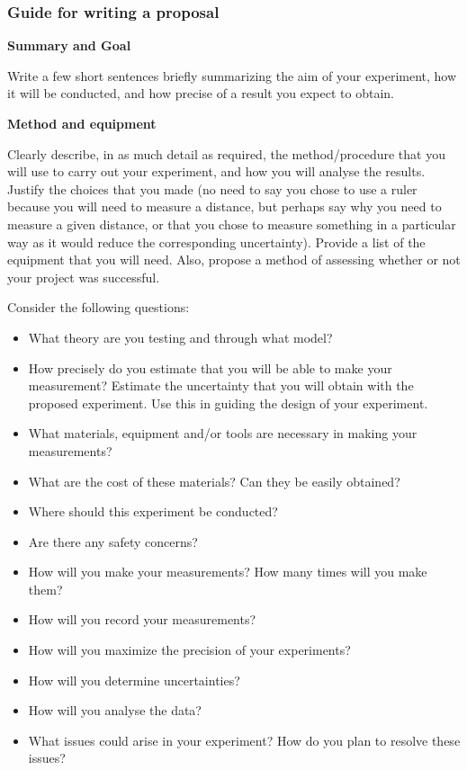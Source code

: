 \subsubsection{Guide for writing a proposal}

\textbf{Summary and Goal}

Write a few short sentences briefly summarizing the aim of your experiment, how it will be conducted, and how precise of a result you expect to obtain.

\textbf{Method and equipment}

Clearly describe, in as much detail as required, the method/procedure that you will use to carry out your experiment, and how you will analyse the results. Justify the choices that you made (no need to say you chose to use a ruler because you will need to measure a distance, but perhaps say why you need to measure a given distance, or that you chose to measure something in a particular way as it would reduce the corresponding uncertainty). Provide a list of the equipment that you will need. Also, propose a method of assessing whether or not your project was successful.

Consider the following questions:

\begin{itemize}
\item What theory are you testing and through what model?
\item How precisely do you estimate that you will be able to make your measurement? Estimate the uncertainty that you will obtain with the proposed experiment. Use this in guiding the design of your experiment.
\item What materials, equipment and/or tools are necessary in making your measurements?
\item What are the cost of these materials? Can they be easily obtained?
\item Where should this experiment be conducted?
\item Are there any safety concerns?
\item How will you make your measurements? How many times will you make them?
\item How will you record your measurements?
\item How will you maximize the precision of your experiments?
\item How will you determine uncertainties?
\item How will you analyse the data?
\item What issues could arise in your experiment? How do you plan to resolve these issues?
\end{itemize}

